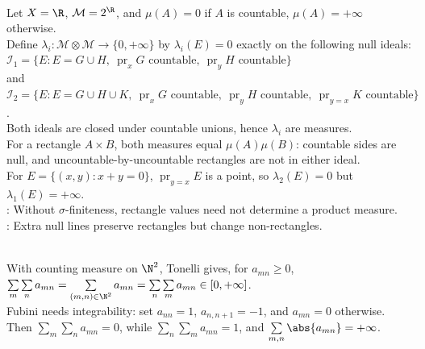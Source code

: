 \begin{example} \label{ex:nonunique-products-without-sigma-finiteness} \\
Let $X=\R$, $\mathcal{M}=2^\R$, and $\mu(A)=0$ if $A$ is countable, $\mu(A)=+\infty$ otherwise.\\
Define $\lambda_i:\mathcal{M}\otimes\mathcal{M}\to\{0,+\infty\}$ by $\lambda_i(E)=0$ exactly on the following null ideals:\\
$\mathcal{I}_1=\{E:E=G\cup H,\ \operatorname{pr}_xG\text{ countable},\ \operatorname{pr}_yH\text{ countable}\}$\\
and $\mathcal{I}_2=\{E:E=G\cup H\cup K,\ \operatorname{pr}_xG\text{ countable},\ \operatorname{pr}_yH\text{ countable},\ \operatorname{pr}_{y=x}K\text{ countable}\}$.\\
Both ideals are closed under countable unions, hence $\lambda_i$ are measures.\\
For a rectangle $A\times B$, both measures equal $\mu(A)\mu(B)$: countable sides are null, and uncountable-by-uncountable rectangles are not in either ideal.\\
For $E=\{(x,y):x+y=0\}$, $\operatorname{pr}_{y=x}E$ is a point, so $\lambda_2(E)=0$ but $\lambda_1(E)=+\infty$.\\
: Without $\sigma$-finiteness, rectangle values need not determine a product measure.\\
: Extra null lines preserve rectangles but change non-rectangles.
\end{example}

\begin{example} \label{ex:double-series-tonelli-fubini-contrast} \\
With counting measure on $\N^2$, Tonelli gives, for $a_{mn}\geq0$,\\
$\sum\limits_m\sum\limits_na_{mn}=\sum\limits_{(m,n)\in\N^2}a_{mn}=\sum\limits_n\sum\limits_ma_{mn}\in[0,+\infty]$.\\
Fubini needs integrability: set $a_{nn}=1$, $a_{n,n+1}=-1$, and $a_{mn}=0$ otherwise.\\
Then $\sum\limits_m\sum\limits_na_{mn}=0$, while $\sum\limits_n\sum\limits_ma_{mn}=1$, and $\sum\limits_{m,n}\abs{a_{mn}}=+\infty$.
\end{example}

